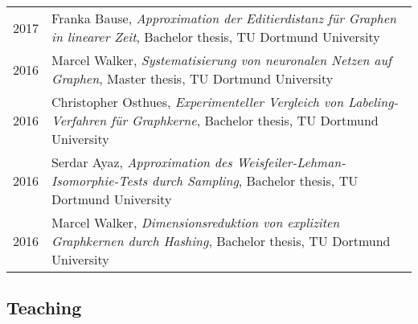 \documentclass[10pt, a4paper, DIV=14, headings=small]{scrartcl}
\begin{document}
\begin{longtabu}{p{2.1cm}p{12.0cm}}
	2017 & Franka Bause, \emph{Approximation der Editierdistanz für Graphen in linearer Zeit}, Bachelor thesis, TU Dortmund University                                                                          \\
	2016 & Marcel Walker, \emph{Systematisierung von neuronalen Netzen auf Graphen}, Master thesis, TU Dortmund University                                                                                      \\
	2016 & Christopher Osthues, \emph{Experimenteller Vergleich von Labeling-Verfahren für Graphkerne}, Bachelor thesis, TU Dortmund University                                                                 \\
	2016 & Serdar Ayaz, \emph{Approximation des Weisfeiler-Lehman-Isomorphie-Tests durch Sampling}, Bachelor thesis, TU Dortmund University                                                                     \\
	2016 & Marcel Walker, \emph{Dimensionsreduktion von expliziten Graphkernen durch Hashing}, Bachelor thesis, TU Dortmund University                                                                          \\
\end{longtabu}


\subsection*{Teaching}
\end{document}
